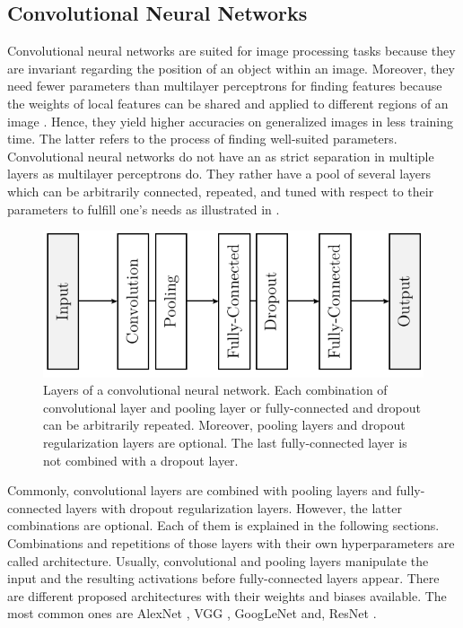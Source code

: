 \subsection{Convolutional Neural Networks}
\label{sec:neural-networks-convolutional-neural-networks}
Convolutional neural networks are suited for image processing tasks because they are invariant regarding the position of an object within an image.
Moreover, they need fewer parameters than multilayer perceptrons for finding features because the weights of local features can be shared and applied to different regions of an image \cite{LeCun1998cnn, Lecun98}.
Hence, they yield higher accuracies on generalized images in less training time.
The latter refers to the process of finding well-suited parameters.
Convolutional neural networks do not have an as strict separation in multiple layers as multilayer perceptrons do.
They rather have a pool of several layers which can be arbitrarily connected, repeated, and tuned with respect to their parameters to fulfill one's needs as illustrated in .
\begin{figure}
	\centering
	\includegraphics[]{images/cnn_layers.pdf}
	\caption[Layers of a convolutional neural network]{Layers of a convolutional neural network. Each combination of convolutional layer and pooling layer or fully-connected and dropout can be arbitrarily repeated. Moreover, pooling layers and dropout regularization layers are optional. The last fully-connected layer is not combined with a dropout layer.}
	\label{fig:cnn-layers}
\end{figure}
Commonly, convolutional layers are combined with pooling layers and fully-connected layers with dropout regularization layers.
However, the latter combinations are optional.
Each of them is explained in the following sections.
Combinations and repetitions of those layers with their own hyperparameters are called architecture.
Usually, convolutional and pooling layers manipulate the input and the resulting activations before fully-connected layers appear.
There are different proposed architectures with their weights and biases available.
The most common ones are AlexNet \cite{Krizhevsky:2012:ICD:2999134.2999257}, VGG \cite{Simonyan15}, GoogLeNet \cite{szegedy2015} and, ResNet \cite{He2016ResNet}.



